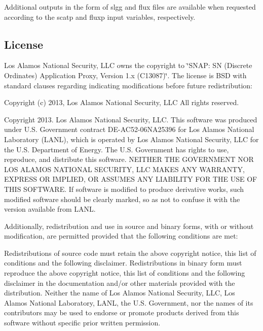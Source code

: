 Additional outputs in the form of {\ttfamily slgg} and {\ttfamily flux} files are available when requested according to the {\ttfamily scatp} and {\ttfamily fluxp} input variables, respectively.

\subsection*{License}

Los Alamos National Security, L\-L\-C owns the copyright to \char`\"{}\-S\-N\-A\-P\-: S\-N (\-Discrete Ordinates) Application Proxy, Version 1.\-x (\-C13087)\char`\"{}. The license is B\-S\-D with standard clauses regarding indicating modifications before future redistribution\-:

Copyright (c) 2013, Los Alamos National Security, L\-L\-C All rights reserved.

Copyright 2013. Los Alamos National Security, L\-L\-C. This software was produced under U.\-S. Government contract D\-E-\/\-A\-C52-\/06\-N\-A25396 for Los Alamos National Laboratory (L\-A\-N\-L), which is operated by Los Alamos National Security, L\-L\-C for the U.\-S. Department of Energy. The U.\-S. Government has rights to use, reproduce, and distribute this software. N\-E\-I\-T\-H\-E\-R T\-H\-E G\-O\-V\-E\-R\-N\-M\-E\-N\-T N\-O\-R L\-O\-S A\-L\-A\-M\-O\-S N\-A\-T\-I\-O\-N\-A\-L S\-E\-C\-U\-R\-I\-T\-Y, L\-L\-C M\-A\-K\-E\-S A\-N\-Y W\-A\-R\-R\-A\-N\-T\-Y, E\-X\-P\-R\-E\-S\-S O\-R I\-M\-P\-L\-I\-E\-D, O\-R A\-S\-S\-U\-M\-E\-S A\-N\-Y L\-I\-A\-B\-I\-L\-I\-T\-Y F\-O\-R T\-H\-E U\-S\-E O\-F T\-H\-I\-S S\-O\-F\-T\-W\-A\-R\-E. If software is modified to produce derivative works, such modified software should be clearly marked, so as not to confuse it with the version available from L\-A\-N\-L.

Additionally, redistribution and use in source and binary forms, with or without modification, are permitted provided that the following conditions are met\-:

Redistributions of source code must retain the above copyright notice, this list of conditions and the following disclaimer. Redistributions in binary form must reproduce the above copyright notice, this list of conditions and the following disclaimer in the documentation and/or other materials provided with the distribution. Neither the name of Los Alamos National Security, L\-L\-C, Los Alamos National Laboratory, L\-A\-N\-L, the U.\-S. Government, nor the names of its contributors may be used to endorse or promote products derived from this software without specific prior written permission.

